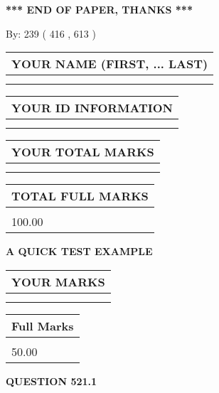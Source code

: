 \documentclass[12pt]{article}
\begin{document}
\vspace{1.0in} 
{\textbf{\large{ *** END OF PAPER, THANKS *** }}} 
   
   
\hspace{1.0in} By: 
 239 ( 416 ,  613 )
   
   
   
   
\newpage 
\setcounter{page}{ 
   521001 } 
   
   
   
   
\noindent\begin{tabular}{|l|}
\hline
YOUR NAME (FIRST, ... LAST)  \\
\hline
 \\ 
 \\ 
\hline
\end{tabular}
\hspace{0.05in} \begin{tabular}{|l|}
\hline
 YOUR   ID   INFORMATION  \\
\hline
 \\ 
 \\ 
\hline
\end{tabular}
   
   
\vspace{0.2in}\noindent\begin{tabular}{|l|}
\hline
YOUR TOTAL MARKS  \\
\hline
 \\ 
 \\ 
\hline
\end{tabular}
\hspace{0.05in} \begin{tabular}{|l|}
\hline
TOTAL FULL MARKS  \\
\hline
 \\ 
100.00 \\
\hline
\end{tabular}
   
   
 \vspace{0.2in}
{\LARGE {\textbf{ A QUICK TEST EXAMPLE}}}
   
   
  
\vspace{0.2in}
  
\noindent\begin{tabular}{|l|}
\hline
 YOUR MARKS  \\
\hline
 \\ 
 \\ 
\hline
\end{tabular}
\hspace{0.05in} \begin{tabular}{|l|}
\hline
 Full Marks  \\
\hline
 \\ 
50.00 \\
\hline
\end{tabular}
{\textbf{\Large{QUESTION
521.1 
}}}
  
\end{document}
